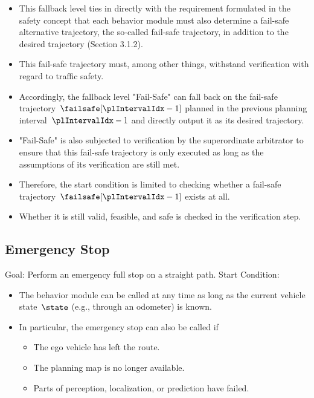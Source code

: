 \begin{itemize}
    \item This fallback level ties in directly with the requirement formulated in the safety concept that each behavior module must also determine a fail-safe alternative trajectory, the so-called fail-safe trajectory, in addition to the desired trajectory (Section 3.1.2).
    \item This fail-safe trajectory must, among other things, withstand verification with regard to traffic safety.
    \item Accordingly, the fallback level "Fail-Safe" can fall back on the fail-safe trajectory~$\failsafe[\plIntervalIdx-1]$ planned in the previous planning interval~$\plIntervalIdx-1$ and directly output it as its desired trajectory.
    \item "Fail-Safe" is also subjected to verification by the superordinate arbitrator to ensure that this fail-safe trajectory is only executed as long as the assumptions of its verification are still met.
    \item Therefore, the start condition is limited to checking whether a fail-safe trajectory~$\failsafe[\plIntervalIdx-1]$ exists at all.
    \item Whether it is still valid, feasible, and safe is checked in the verification step.
\end{itemize}

\subsection{Emergency Stop}

    Goal: Perform an emergency full stop on a straight path.
    Start Condition:

\begin{itemize}
    \item The behavior module can be called at any time as long as the current vehicle state~$\state$ (e.g., through an odometer) is known.
    \item In particular, the emergency stop can also be called if
          \begin{itemize}
              \item The ego vehicle has left the route.
              \item The planning map is no longer available.
              \item Parts of perception, localization, or prediction have failed.
          \end{itemize}
\end{itemize}

